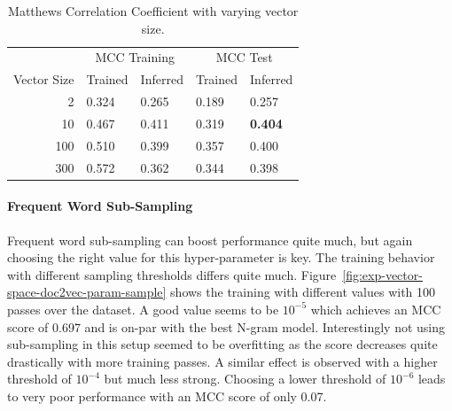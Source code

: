 \begin{table}[h]
  \begin{center}
    \begin{tabular}{ r | *2l | *2l }
      \toprule
       & \multicolumn{2}{c|}{MCC Training} & \multicolumn{2}{|c}{MCC Test}\\
      Vector Size & Trained & Inferred & Trained & Inferred \\
      \midrule
      2 & 0.324 & 0.265 & 0.189 & 0.257 \\
      10 & 0.467 & 0.411 & 0.319 & \textbf{0.404} \\
      100 & 0.510 & 0.399 & 0.357 & 0.400 \\
      300 & 0.572 & 0.362 & 0.344 & 0.398 \\
      \bottomrule
    \end{tabular}


  \caption{Matthews Correlation Coefficient with varying vector size.}
\label{tab:Paragraph Vector Parameter Results Size}
\end{center}
\end{table}

\paragraph{Frequent Word Sub-Sampling}
Frequent word sub-sampling can boost performance quite much, but again choosing the right value for this hyper-parameter is key. The training behavior with different sampling thresholds differs quite much. Figure~\ref{fig:exp-vector-space-doc2vec-param-sample} shows the training with different values with 100 passes over the dataset. A good value seems to be $10^{-5}$ which achieves an MCC score of 0.697 and is on-par with the best N-gram model. Interestingly not using sub-sampling in this setup seemed to be overfitting as the score decreases quite drastically with more training passes. A similar effect is observed with a higher threshold of $10^{-4}$ but much less strong. Choosing a lower threshold of $10^{-6}$ leads to very poor performance with an MCC score of only 0.07.

